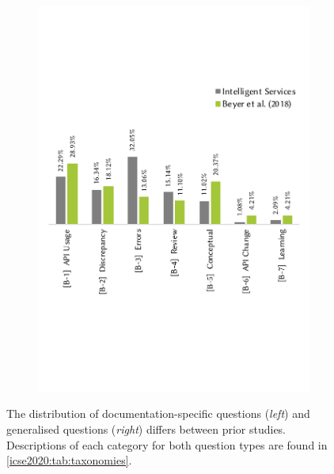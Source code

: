 \begin{figure}[t]
  \hfill
  \begin{subfigure}[c]{0.49\linewidth}
    \centering
    \includegraphics[width=\linewidth]{mainmatter/publications/figures/icse2020/b-compare.pdf}
  \end{subfigure}
    \centering
    \caption[Distribution of issues on Stack Overflow]{The distribution of documentation-specific questions (\textit{left}) and generalised questions (\textit{right}) differs between prior studies. Descriptions of each category for both question types are found in \cref{icse2020:tab:taxonomies}.}
    \label{fig:conclusion:question-diff}
\end{figure}


